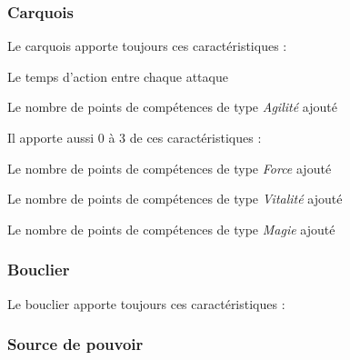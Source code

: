 \documentclass[11pt, a4paper, oneside]{report}
\begin{document}
\subsubsection{Carquois}
Le carquois apporte toujours ces caractéristiques :
\begin{description}[labelindent=1cm]
	\item[Vitesse d'attaque] Le temps d'action entre chaque attaque
	\item[Agilité] Le nombre de points de compétences de type \emph{Agilité} ajouté
\end{description}
Il apporte aussi 0 à 3 de ces caractéristiques :
\begin{description}[labelindent=1cm]
    \item[Force] Le nombre de points de compétences de type \emph{Force} ajouté
    \item[Vitalité] Le nombre de points de compétences de type \emph{Vitalité} ajouté
    \item[Magie] Le nombre de points de compétences de type \emph{Magie} ajouté
\end{description}
\subsubsection{Bouclier}
Le bouclier apporte toujours ces caractéristiques :

\subsubsection{Source de pouvoir}
\end{document}
